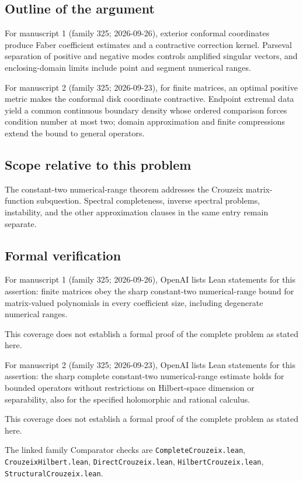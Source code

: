 \documentclass[11pt]{article}
\begin{document}
\subsection{Outline of the argument}
For manuscript 1 (family 325; 2026-09-26), exterior conformal coordinates produce Faber coefficient estimates and a contractive correction kernel. Parseval separation of positive and negative modes controls amplified singular vectors, and enclosing-domain limits include point and segment numerical ranges.

For manuscript 2 (family 325; 2026-09-23), for finite matrices, an optimal positive metric makes the conformal disk coordinate contractive. Endpoint extremal data yield a common continuous boundary density whose ordered comparison forces condition number at most two; domain approximation and finite compressions extend the bound to general operators.

\subsection{Scope relative to this problem}
The constant-two numerical-range theorem addresses the Crouzeix matrix-function subquestion. Spectral completeness, inverse spectral problems, instability, and the other approximation clauses in the same entry remain separate.

\subsection{Formal verification}
For manuscript 1 (family 325; 2026-09-26), OpenAI lists Lean statements for this assertion: finite matrices obey the sharp constant-two numerical-range bound for matrix-valued polynomials in every coefficient size, including degenerate numerical ranges.

This coverage does not establish a formal proof of the complete problem as stated here.

For manuscript 2 (family 325; 2026-09-23), OpenAI lists Lean statements for this assertion: the sharp complete constant-two numerical-range estimate holds for bounded operators without restrictions on Hilbert-space dimension or separability, also for the specified holomorphic and rational calculus.

This coverage does not establish a formal proof of the complete problem as stated here.

The linked family Comparator checks are \texttt{CompleteCrouzeix.lean}, \texttt{CrouzeixHilbert.lean}, \texttt{DirectCrouzeix.lean}, \texttt{HilbertCrouzeix.lean}, \texttt{StructuralCrouzeix.lean}.
\end{document}
